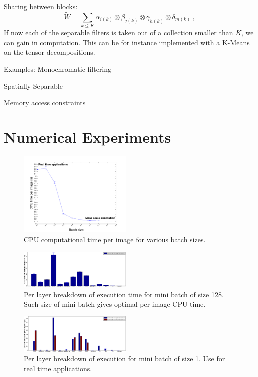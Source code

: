 \documentclass{article}
\begin{document}
 
 Sharing between blocks: 
\begin{equation}
\label{rankoptim}
 \widetilde{W} = \sum_{k\leq K} \alpha_{i(k)} \otimes \beta_{j(k)} \otimes \gamma_{h(k)} \otimes \delta_{m(k)}~,
\end{equation}
If now each of the separable filters is taken out of a collection smaller than $K$, we can gain 
in computation. This can be for instance implemented with a K-Means on the tensor decompositions.


Examples:
Monochromatic filtering

Spatially Separable

Memory access constraints


\section{Numerical Experiments}

\begin{figure}[ht]
  \includegraphics[width=0.48\textwidth]{img/eval_per_batch.png}
  \caption{CPU computational time per image for various batch sizes.}
\end{figure}
\begin{figure}[ht]
  \includegraphics[width=0.48\textwidth]{img/eval_per_layer_per_batch_128_batch_size.png}
  \caption{Per layer breakdown of execution time for mini batch of size 128. Such size of mini batch gives optimal per image CPU time.}
\end{figure}
\begin{figure}[ht]
  \includegraphics[width=0.48\textwidth]{img/eval_per_layer_per_batch_1_batch_size.png}
  \caption{Per layer breakdown of execution for mini batch of size 1. Use for real time applications.}
\end{figure}
\end{document}
